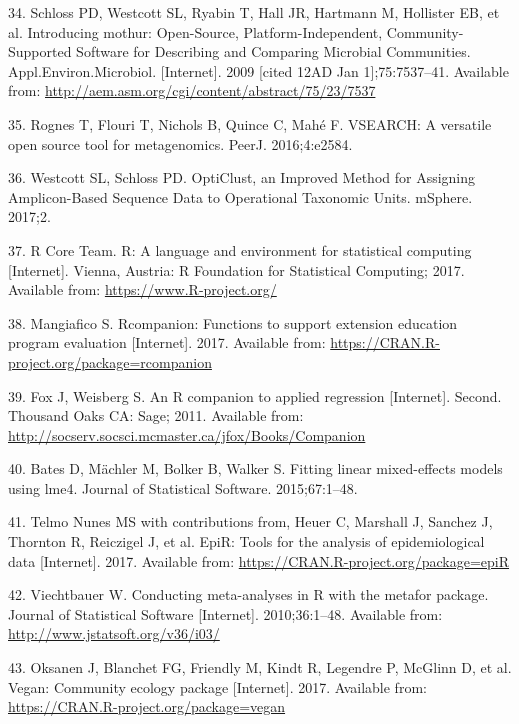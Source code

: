 \documentclass[12pt,]{article}
\begin{document}
\hypertarget{ref-schloss_introducing_2009}{}
34. Schloss PD, Westcott SL, Ryabin T, Hall JR, Hartmann M, Hollister
EB, et al. Introducing mothur: Open-Source, Platform-Independent,
Community-Supported Software for Describing and Comparing Microbial
Communities. Appl.Environ.Microbiol. {[}Internet{]}. 2009 {[}cited 12AD
Jan 1{]};75:7537--41. Available from:
\url{http://aem.asm.org/cgi/content/abstract/75/23/7537}

\hypertarget{ref-rognes_vsearch_2016}{}
35. Rognes T, Flouri T, Nichols B, Quince C, Mahé F. VSEARCH: A
versatile open source tool for metagenomics. PeerJ. 2016;4:e2584.

\hypertarget{ref-westcott_opticlust_2017}{}
36. Westcott SL, Schloss PD. OptiClust, an Improved Method for Assigning
Amplicon-Based Sequence Data to Operational Taxonomic Units. mSphere.
2017;2.

\hypertarget{ref-r_citation_2017}{}
37. R Core Team. R: A language and environment for statistical computing
{[}Internet{]}. Vienna, Austria: R Foundation for Statistical Computing;
2017. Available from: \url{https://www.R-project.org/}

\hypertarget{ref-rcompanion_citation_2017}{}
38. Mangiafico S. Rcompanion: Functions to support extension education
program evaluation {[}Internet{]}. 2017. Available from:
\url{https://CRAN.R-project.org/package=rcompanion}

\hypertarget{ref-car_citation_2011}{}
39. Fox J, Weisberg S. An R companion to applied regression
{[}Internet{]}. Second. Thousand Oaks CA: Sage; 2011. Available from:
\url{http://socserv.socsci.mcmaster.ca/jfox/Books/Companion}

\hypertarget{ref-lme4_citation_2015}{}
40. Bates D, Mächler M, Bolker B, Walker S. Fitting linear mixed-effects
models using lme4. Journal of Statistical Software. 2015;67:1--48.

\hypertarget{ref-epir_citation_2017}{}
41. Telmo Nunes MS with contributions from, Heuer C, Marshall J, Sanchez
J, Thornton R, Reiczigel J, et al. EpiR: Tools for the analysis of
epidemiological data {[}Internet{]}. 2017. Available from:
\url{https://CRAN.R-project.org/package=epiR}

\hypertarget{ref-metafor_citation_2010}{}
42. Viechtbauer W. Conducting meta-analyses in R with the metafor
package. Journal of Statistical Software {[}Internet{]}. 2010;36:1--48.
Available from: \url{http://www.jstatsoft.org/v36/i03/}

\hypertarget{ref-vegan_citation_2017}{}
43. Oksanen J, Blanchet FG, Friendly M, Kindt R, Legendre P, McGlinn D,
et al. Vegan: Community ecology package {[}Internet{]}. 2017. Available
from: \url{https://CRAN.R-project.org/package=vegan}
\end{document}
